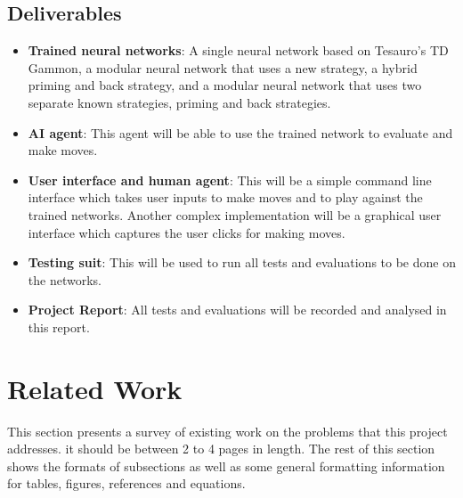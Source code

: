 \documentclass[12pt,a4paper]{article}
\begin{document}
\subsection{Deliverables}
\begin{itemize}
    \item \textbf{Trained neural networks}: A single neural network based on Tesauro's TD Gammon, a modular neural network that uses a new strategy, a hybrid priming and back strategy, and a modular neural network that uses two separate known strategies, priming and back strategies.
    \item \textbf{AI agent}: This agent will be able to use the trained network to evaluate and make moves.
    \item \textbf{User interface and human agent}: This will be a simple command line interface which takes user inputs to make moves and to play against the trained networks. Another complex implementation will be a graphical user interface which captures the user clicks for making moves.
    \item \textbf{Testing suit}: This will be used to run all tests and evaluations to be done on the networks.
    \item \textbf{Project Report}: All tests and evaluations will be recorded and analysed in this report.
\end{itemize}

\section{Related Work}
This section presents a survey of existing work on the problems that this project addresses.  it should be between 2 to 4 pages in length.  The rest of this section shows the formats of subsections as well as some general formatting information for tables, figures, references and equations.

\end{document}

